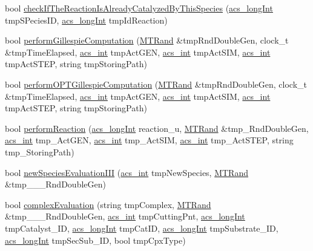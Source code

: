 \begin{DoxyCompactItemize}
\item 
bool \hyperlink{classenvironment_ac4c90b07b8e75ea03e2ced0ea644a69f}{check\-If\-The\-Reaction\-Is\-Already\-Catalyzed\-By\-This\-Species} (\hyperlink{acs__headers_8h_a19319d75f02db4308bc5c0026d98cd85}{acs\-\_\-long\-Int} tmp\-S\-Pecies\-I\-D, \hyperlink{acs__headers_8h_a19319d75f02db4308bc5c0026d98cd85}{acs\-\_\-long\-Int} tmp\-Id\-Reaction)
\item 
bool \hyperlink{classenvironment_a2cb0152bf789918e7d92685f947ce48f}{perform\-Gillespie\-Computation} (\hyperlink{class_m_t_rand}{M\-T\-Rand} \&tmp\-Rnd\-Double\-Gen, clock\-\_\-t \&tmp\-Time\-Elapsed, \hyperlink{acs__headers_8h_a8d277355641a098190360234e2ebde35}{acs\-\_\-int} tmp\-Act\-G\-E\-N, \hyperlink{acs__headers_8h_a8d277355641a098190360234e2ebde35}{acs\-\_\-int} tmp\-Act\-S\-I\-M, \hyperlink{acs__headers_8h_a8d277355641a098190360234e2ebde35}{acs\-\_\-int} tmp\-Act\-S\-T\-E\-P, string tmp\-Storing\-Path)
\item 
bool \hyperlink{classenvironment_a90fba3b2cc589f32c97a74540620bd84}{perform\-O\-P\-T\-Gillespie\-Computation} (\hyperlink{class_m_t_rand}{M\-T\-Rand} \&tmp\-Rnd\-Double\-Gen, clock\-\_\-t \&tmp\-Time\-Elapsed, \hyperlink{acs__headers_8h_a8d277355641a098190360234e2ebde35}{acs\-\_\-int} tmp\-Act\-G\-E\-N, \hyperlink{acs__headers_8h_a8d277355641a098190360234e2ebde35}{acs\-\_\-int} tmp\-Act\-S\-I\-M, \hyperlink{acs__headers_8h_a8d277355641a098190360234e2ebde35}{acs\-\_\-int} tmp\-Act\-S\-T\-E\-P, string tmp\-Storing\-Path)
\item 
bool \hyperlink{classenvironment_a1db4e67ba458a54f4fab3e10a203765c}{perform\-Reaction} (\hyperlink{acs__headers_8h_a19319d75f02db4308bc5c0026d98cd85}{acs\-\_\-long\-Int} reaction\-\_\-u, \hyperlink{class_m_t_rand}{M\-T\-Rand} \&tmp\-\_\-\-Rnd\-Double\-Gen, \hyperlink{acs__headers_8h_a8d277355641a098190360234e2ebde35}{acs\-\_\-int} tmp\-\_\-\-Act\-G\-E\-N, \hyperlink{acs__headers_8h_a8d277355641a098190360234e2ebde35}{acs\-\_\-int} tmp\-\_\-\-Act\-S\-I\-M, \hyperlink{acs__headers_8h_a8d277355641a098190360234e2ebde35}{acs\-\_\-int} tmp\-\_\-\-Act\-S\-T\-E\-P, string tmp\-\_\-\-Storing\-Path)
\item 
bool \hyperlink{classenvironment_aaf76ff29b387a5308fdd34470994732f}{new\-Species\-Evaluation\-I\-I\-I} (\hyperlink{acs__headers_8h_a8d277355641a098190360234e2ebde35}{acs\-\_\-int} tmp\-New\-Species, \hyperlink{class_m_t_rand}{M\-T\-Rand} \&tmp\-\_\-\-\_\-\-\_\-\-Rnd\-Double\-Gen)
\item 
bool \hyperlink{classenvironment_a5ee6b203f077de1467aa72042814db7d}{complex\-Evaluation} (string tmp\-Complex, \hyperlink{class_m_t_rand}{M\-T\-Rand} \&tmp\-\_\-\-\_\-\-\_\-\-Rnd\-Double\-Gen, \hyperlink{acs__headers_8h_a8d277355641a098190360234e2ebde35}{acs\-\_\-int} tmp\-Cutting\-Pnt, \hyperlink{acs__headers_8h_a19319d75f02db4308bc5c0026d98cd85}{acs\-\_\-long\-Int} tmp\-Catalyst\-\_\-\-I\-D, \hyperlink{acs__headers_8h_a19319d75f02db4308bc5c0026d98cd85}{acs\-\_\-long\-Int} tmp\-Cat\-I\-D, \hyperlink{acs__headers_8h_a19319d75f02db4308bc5c0026d98cd85}{acs\-\_\-long\-Int} tmp\-Substrate\-\_\-\-I\-D, \hyperlink{acs__headers_8h_a19319d75f02db4308bc5c0026d98cd85}{acs\-\_\-long\-Int} tmp\-Sec\-Sub\-\_\-\-I\-D, bool tmp\-Cpx\-Type)

\end{DoxyCompactItemize}
